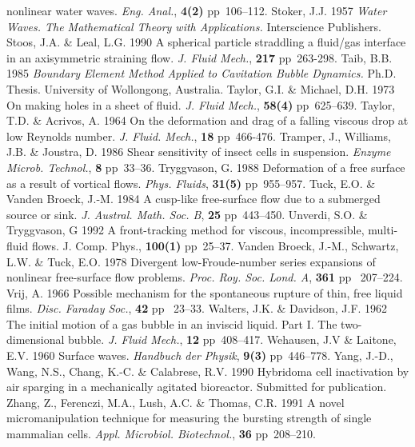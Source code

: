 nonlinear water waves. {\sl Eng. Anal.}, {\bf 4(2)} pp~106--112.
\vskip 8pt
Stoker, J.J. 1957 {\sl Water Waves. The Mathematical Theory with Applications.} 
Interscience Publishers.
\vskip 8pt
Stoos, J.A. \& Leal, L.G. 1990 A spherical particle straddling a fluid/gas
interface in an axisymmetric straining flow. {\sl J. Fluid Mech.}, 
{\bf 217} pp~263-298.
\vskip 8pt
Taib, B.B. 1985 {\sl Boundary Element Method Applied to Cavitation Bubble
Dynamics.} Ph.D. Thesis. University of Wollongong, Australia.
\vskip 8pt
Taylor, G.I. \& Michael, D.H. 1973 On making holes in a sheet of fluid. 
{\sl J. Fluid Mech.}, {\bf 58(4)} pp~625--639.
\vskip 8pt
Taylor, T.D. \& Acrivos, A. 1964 On the deformation and drag of a falling
viscous drop at low Reynolds number. {\sl J. Fluid. Mech.}, {\bf 18} 
pp~466-476.
\vskip 8pt
Tramper, J., Williams, J.B. \& Joustra, D. 1986 Shear sensitivity of 
insect cells in suspension. {\sl Enzyme Microb. Technol.}, {\bf 8} pp~33--36.
\vskip 8pt
Tryggvason, G. 1988 Deformation of a free surface as a result of 
vortical flows. {\sl Phys. Fluids}, {\bf 31(5)} pp~955--957.
\vskip 8pt
Tuck, E.O. \& Vanden Broeck, J.-M. 1984 A cusp-like free-surface 
flow due to a submerged source or sink. {\sl J. Austral. Math. 
Soc. B}, {\bf 25} pp~443--450.
\vskip 8pt
Unverdi, S.O. \& Tryggvason, G 1992 A front-tracking method for viscous, 
incompressible, multi-fluid flows. {J. Comp. Phys.}, {\bf 100(1)} pp~25--37.
\vskip 8pt
Vanden Broeck, J.-M., Schwartz, L.W. \& Tuck, E.O. 1978 Divergent 
low-Froude-number series expansions of nonlinear free-surface 
flow problems. {\sl Proc. Roy. Soc. Lond. A}, {\bf 361} pp~
207--224.
\vskip 8pt
Vrij, A. 1966 Possible mechanism for the spontaneous rupture of 
thin, free liquid films. {\sl Disc. Faraday Soc.}, {\bf 42} pp~
23--33.
\vskip 8pt
Walters, J.K. \& Davidson, J.F. 1962 The initial motion of a gas bubble
in an inviscid liquid. Part I. The two-dimensional bubble. {\sl J. Fluid
Mech.}, {\bf 12} pp~408--417.
\vskip 8pt
Wehausen, J.V \& Laitone, E.V. 1960 Surface waves. {\sl Handbuch der 
Physik}, {\bf 9(3)} pp~446--778.
\vskip 8pt
Yang, J.-D., Wang, N.S., Chang, K.-C. \& Calabrese, R.V. 1990
Hybridoma cell inactivation by air sparging in a mechanically agitated
bioreactor. Submitted for publication.
\vskip 8pt
Zhang, Z., Ferenczi, M.A., Lush, A.C. \& 
Thomas, C.R. 1991 A novel 
micromanipulation technique for measuring the bursting strength of
single mammalian cells. {\sl Appl. Microbiol. Biotechnol.},
{\bf 36} pp~208--210.
